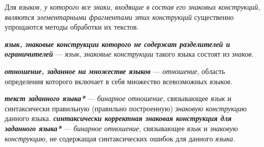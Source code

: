 Для \textit{языков, у которого все знаки, входящие в состав его знаковых конструкций, являются элементарными фрагментами этих конструкций} существенно упрощаются методы обработки их текстов.

\textbf{\textit{язык, знаковые конструкции которого не содержат разделителей и ограничителей}} --- \textit{язык}, \textit{знаковые конструкции} такого языка состоят  из \textit{знаков}.

\textbf{\textit{отношение, заданное на множестве языков}} --- \textit{отношение}, область определения которого включает в себя множество всевозможных \textit{языков}.

\textbf{\textit{текст заданного языка*}} --- \textit{бинарное отношение}, связывающее \textit{язык} и синтаксически правильную (правильно построенную) \textit{знаковую конструкцию} данного языка.
\textbf{\textit{синтаксически корректная знаковая конструкция для заданного языка*}} --- \textit{бинарное отношение}, связывающее \textit{язык} и \textit{знаковую конструкцию}, не содержащая синтаксических ошибок для данного \textit{языка}.

